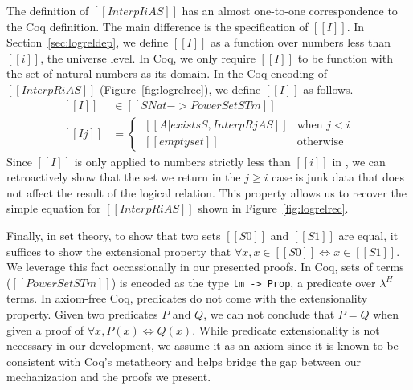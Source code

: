 \documentclass[acmsmall,screen=true,
\ifpublic review=false\else,review=true\fi
  ,anonymous=\ifanonymous true\else false\fi]{acmart}
\newcommand{\lang}{$\lambda^H$\xspace}
\begin{document}
The definition of $[[Interp I i A S]]$ has an almost one-to-one
correspondence to the Coq definition. The main difference is the
specification of $[[I]]$. In
Section~\ref{sec:logreldep}, we define $[[I]]$ as a function over
numbers less than $[[i]]$, the universe level. In Coq, we only require
$[[I]]$ to be function with the set of natural numbers as its domain.
In the Coq encoding of $[[InterpR i A S]]$ (Figure~\ref{fig:logrelrec}), we define $[[I]]$ as follows.
\begin{equation*}
  \begin{split}
    [[I]]   &\in [[SNat -> PowerSet STm]] \\
    [[I j]] &=
     \begin{cases}
      \ [[{A | exists S , InterpR j A S}]] & \text{when } j < i \\
      \ [[emptyset]] & \text{otherwise}
    \end{cases}
  \end{split}
\end{equation*}
Since $[[I]]$ is only applied to numbers strictly less than $[[i]]$ in
, we can retroactively show that the set we return in the $j
\geq i$ case is junk data that does not affect the result of the logical
relation. This property allows us to recover the simple equation for $[[InterpR i A S]]$ shown in Figure~\ref{fig:logrelrec}.

Finally, in set theory, to show that two sets $[[S0]]$ and $[[S1]]$
are equal, it suffices to show the extensional property that $\forall
x, x \in [[S0]] \iff x \in [[S1]]$. We leverage this fact
occassionally in our presented proofs.
In Coq, sets of terms ($[[PowerSet STm]]$) is encoded as the type \texttt{tm ->
Prop}, a predicate over \lang{} terms.
In axiom-free Coq, predicates do not come with the extensionality
property. Given two predicates $P$ and $Q$, we can not conclude that
$P = Q$ when given a proof of $\forall
x, P(x) \iff Q(x)$. While
predicate extensionality is not necessary in our development, we
assume it as an axiom since it is known to be consistent with Coq's
metatheory and helps bridge the gap between our mechanization and the
proofs we present.


\end{document}
